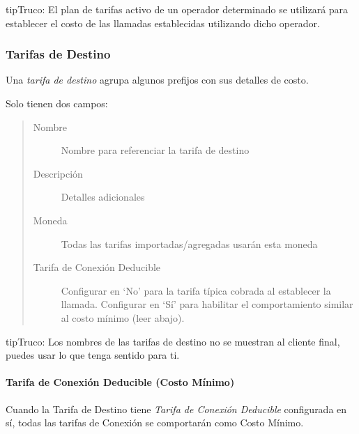 \documentclass[letterpaper,10pt,spanish]{sphinxmanual}
\begin{document}
\begin{notice}{tip}{Truco:}
El plan de tarifas activo de un operador determinado se utilizará para establecer el costo de las llamadas establecidas utilizando dicho operador.
\end{notice}


\subsubsection{Tarifas de Destino}
\label{administration_portal/brand/billing/destination_rates:id1}\label{administration_portal/brand/billing/destination_rates::doc}\label{administration_portal/brand/billing/destination_rates:destination-rates}
Una \emph{tarifa de destino} agrupa algunos prefijos con sus detalles de costo.

Solo tienen dos campos:
\begin{quote}
\begin{description}
\item[{Nombre}] \leavevmode
Nombre para referenciar la tarifa de destino

\item[{Descripción}] \leavevmode
Detalles adicionales

\item[{Moneda}] \leavevmode
Todas las tarifas importadas/agregadas usarán esta moneda

\item[{Tarifa de Conexión Deducible}] \leavevmode
Configurar en `No' para la tarifa típica cobrada al establecer la llamada. Configurar en `Sí' para habilitar el comportamiento similar al costo mínimo (leer abajo).

\end{description}
\end{quote}

\begin{notice}{tip}{Truco:}
Los nombres de las tarifas de destino no se muestran al cliente final, puedes usar lo que tenga sentido para ti.
\end{notice}


\paragraph{Tarifa de Conexión Deducible (Costo Mínimo)}
\label{administration_portal/brand/billing/destination_rates:deductible-connection-fee-minimal-cost}
Cuando la Tarifa de Destino tiene \emph{Tarifa de Conexión Deducible} configurada en sí, todas las tarifas de Conexión se comportarán como Costo Mínimo.
\end{document}
